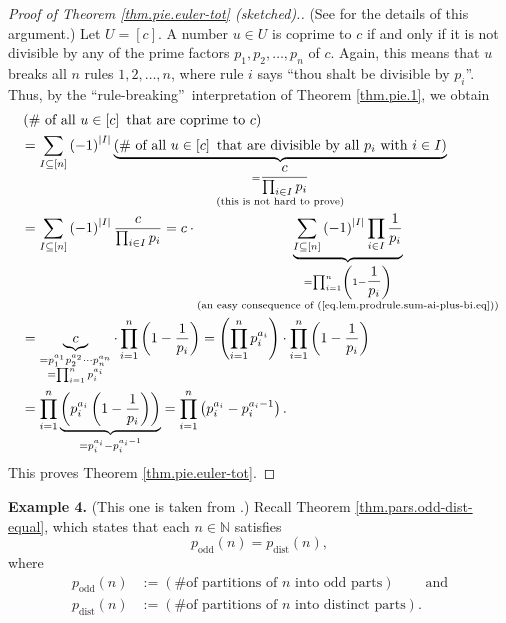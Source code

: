 \begin{proof}
[Proof of Theorem \ref{thm.pie.euler-tot} (sketched).](See \cite[proof of
Theorem 2.9.19]{19fco} for the details of this argument.) Let $U=\left[
c\right]  $. A number $u\in U$ is coprime to $c$ if and only if it is not
divisible by any of the prime factors $p_{1},p_{2},\ldots,p_{n}$ of $c$.
Again, this means that $u$ breaks all $n$ rules $1,2,\ldots,n$, where rule $i$
says \textquotedblleft thou shalt be divisible by $p_{i}$\textquotedblright.
Thus, by the \textquotedblleft rule-breaking\textquotedblright\ interpretation
of Theorem \ref{thm.pie.1}, we obtain%
\begin{align*}
&  \left(  \text{\# of all }u\in\left[  c\right]  \text{ that are coprime to
}c\right) \\
&  =\sum_{I\subseteq\left[  n\right]  }\left(  -1\right)  ^{\left\vert
I\right\vert }\underbrace{\left(  \text{\# of all }u\in\left[  c\right]
\text{ that are divisible by all }p_{i}\text{ with }i\in I\right)
}_{\substack{=\dfrac{c}{\prod_{i\in I}p_{i}}\\\text{(this is not hard to
prove)}}}\\
&  =\sum_{I\subseteq\left[  n\right]  }\left(  -1\right)  ^{\left\vert
I\right\vert }\dfrac{c}{\prod_{i\in I}p_{i}}=c\cdot\underbrace{\sum
_{I\subseteq\left[  n\right]  }\left(  -1\right)  ^{\left\vert I\right\vert
}\prod_{i\in I}\dfrac{1}{p_{i}}}_{\substack{=\prod_{i=1}^{n}\left(
1-\dfrac{1}{p_{i}}\right)  \\\text{(an easy consequence of
(\ref{eq.lem.prodrule.sum-ai-plus-bi.eq}))}}}\\
&  =\underbrace{c}_{\substack{=p_{1}^{a_{1}}p_{2}^{a_{2}}\cdots p_{n}^{a_{n}%
}\\=\prod_{i=1}^{n}p_{i}^{a_{i}}}}\cdot\prod_{i=1}^{n}\left(  1-\dfrac
{1}{p_{i}}\right)  =\left(  \prod_{i=1}^{n}p_{i}^{a_{i}}\right)  \cdot
\prod_{i=1}^{n}\left(  1-\dfrac{1}{p_{i}}\right) \\
&  =\prod_{i=1}^{n}\underbrace{\left(  p_{i}^{a_{i}}\left(  1-\dfrac{1}{p_{i}%
}\right)  \right)  }_{=p_{i}^{a_{i}}-p_{i}^{a_{i}-1}}=\prod_{i=1}^{n}\left(
p_{i}^{a_{i}}-p_{i}^{a_{i}-1}\right)  .
\end{align*}
This proves Theorem \ref{thm.pie.euler-tot}.
\end{proof}

\bigskip

\textbf{Example 4.} (This one is taken from \cite[Theorem 2.3.3]{Sagan19}.)
Recall Theorem \ref{thm.pars.odd-dist-equal}, which states that each
$n\in\mathbb{N}$ satisfies%
\[
p_{\operatorname*{odd}}\left(  n\right)  =p_{\operatorname*{dist}}\left(
n\right)  ,
\]
where%
\begin{align*}
p_{\operatorname*{odd}}\left(  n\right)   &  :=\left(  \text{\# of partitions
of }n\text{ into odd parts}\right)  \ \ \ \ \ \ \ \ \ \ \text{and}\\
p_{\operatorname*{dist}}\left(  n\right)   &  :=\left(  \text{\# of partitions
of }n\text{ into distinct parts}\right)  .
\end{align*}


